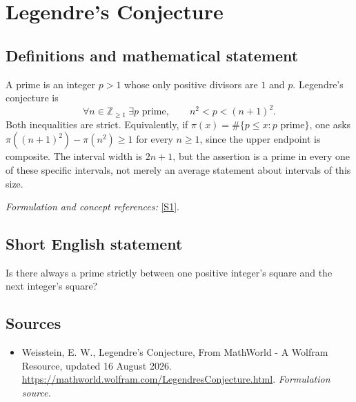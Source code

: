 \documentclass[11pt]{article}
\begin{document}
\section*{\texorpdfstring{Legendre's Conjecture}{Legendre's Conjecture}}\label{25}
\subsection{Definitions and mathematical statement}
A prime is an integer $p>1$ whose only positive divisors are $1$ and $p$. Legendre's conjecture is
\[
 \forall n\in{\mathbb{Z}}_{\ge1}\ \exists p\text{ prime},
 \qquad n^2<p<(n+1)^2.
\]
Both inequalities are strict. Equivalently, if $\pi(x)=\#\{p\le x:p\text{ prime}\}$, one asks $\pi((n+1)^2)-\pi(n^2)\ge1$ for every $n\ge1$, since the upper endpoint is composite. The interval width is $2n+1$, but the assertion is a prime in every one of these specific intervals, not merely an average statement about intervals of this size.
\par\smallskip\textit{Formulation and concept references:} \href{https://mathworld.wolfram.com/LegendresConjecture.html}{[S1]}.

\subsection{Short English statement}
Is there always a prime strictly between one positive integer's square and the next integer's square?
\subsection{Sources}
\begin{itemize}
\item[S1]Weisstein, E. W., Legendre's Conjecture, From MathWorld - A Wolfram Resource, updated 16 August 2026.
\url{https://mathworld.wolfram.com/LegendresConjecture.html}.
\textit{Formulation source.}
\end{itemize}
\end{document}
